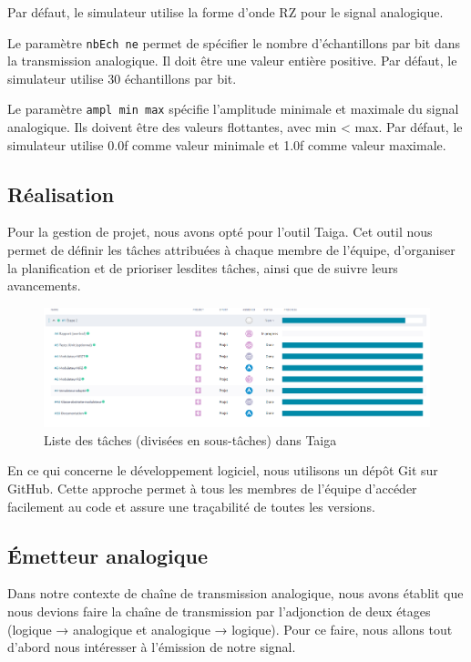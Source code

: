 Par défaut, le simulateur utilise la forme d'onde RZ pour le signal analogique.

Le paramètre \texttt{nbEch ne} permet de spécifier le nombre d'échantillons par bit dans la transmission analogique. Il doit être une valeur entière positive. Par défaut, le simulateur utilise 30 échantillons par bit.

Le paramètre \texttt{ampl min max} spécifie l'amplitude minimale et maximale du signal analogique. Ils doivent être des valeurs flottantes, avec min < max. Par défaut, le simulateur utilise 0.0f comme valeur minimale et 1.0f comme valeur maximale.

\subsection{Réalisation}
Pour la gestion de projet, nous avons opté pour l'outil Taiga. Cet outil nous permet de définir les tâches attribuées à chaque membre de l'équipe, d'organiser la planification et de prioriser lesdites tâches, ainsi que de suivre leurs avancements. 

\begin{figure}[H]
    \centering
    \includegraphics[width=1\textwidth]{img/etape2_taiga.png}
    \caption{Liste des tâches (divisées en sous-tâches) dans Taiga}
    \label{fig:etape2_taiga}
\end{figure}

En ce qui concerne le développement logiciel, nous utilisons un dépôt Git sur GitHub. Cette approche permet à tous les membres de l'équipe d'accéder facilement au code et assure une traçabilité de toutes les versions.


\subsection{Émetteur analogique}
Dans notre contexte de chaîne de transmission analogique, nous avons établit que nous devions faire la chaîne de transmission par l’adjonction de deux étages (logique → analogique et analogique → logique). Pour ce faire, nous allons tout d’abord nous intéresser à l’émission de notre signal. 

